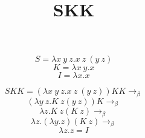 \documentclass{article}
\title{SKK}
\author{}
\date{}
\begin{document}
\maketitle

\[S =  \lambda x\ y\ z.x\ z\ (y\ z)\]
\[K = \lambda x\ y. x\]
\[I = \lambda x.x\]

\[SKK = (\lambda x\ y\ z.x\ z\ (y\ z)) K K \rightarrow_\beta\]
\[(\lambda y\ z.K\ z (y\ z))K \rightarrow_\beta\]
\[\lambda z.K\ z (K\ z) \rightarrow_\beta\]
\[\lambda z.(\lambda y.z)(K\ z) \rightarrow_\beta\]
\[\lambda z.z = I\]
\end{document}
